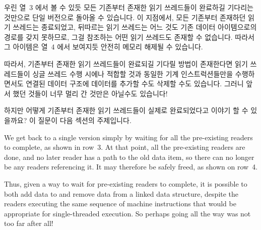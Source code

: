 {{	

}\QuickQuizEndE
}

우린 열~3 에서 볼 수 있듯 모든 기존부터 존재한 읽기 쓰레드들이 완료하길
기다리는 것만으로 단일 버전으로 돌아올 수 있습니다.
이 지점에서, 모든 기존부터 존재하던 읽기 쓰레드는 종료되었고, 뒤따르는 읽기
쓰레드는 어느 것도 기존 데이터 아이템으로의 경로를 갖지 못하므로, 그걸 참조하는
어떤 읽기 쓰레드도 존재할 수 없습니다.
따라서 그 아이템은 열~4 에서 보여지듯 안전히 메모리 해제될 수 있습니다.

따라서, 기존부터 존재한 읽기 쓰레드들이 완료되길 기다릴 방법이 존재한다면
읽기 쓰레드들이 싱글 쓰레드 수행 시에나 적합할 것과 동일한 기계
인스트럭션들만을 수행하면서도 연결된 데이터 구조에 데이터를 추가할 수도 삭제할
수도 있습니다.
그러니 앞서 했던 것들이 너무 멀리 간 것만은 아닐수도 있습니다!

하지만 어떻게 기존부터 존재한 읽기 쓰레드들이 실제로 완료되었다고 이야기 할 수
있을까요?
이 질문이 다음 섹션의 주제입니다.

\iffalse

We get back to a single version simply by waiting for all the
pre-existing readers to complete, as shown in row~3.
At that point, all the pre-existing readers are done, and no later
reader has a path to the old data item, so there can no longer be
any readers referencing it.
It may therefore be safely freed, as shown on row~4.

Thus, given a way to wait for pre-existing readers to complete,
it is possible to both add data to and remove data from a linked
data structure, despite the readers executing the same sequence
of machine instructions that would be appropriate for single-threaded
execution.
So perhaps going all the way was not too far after all!

